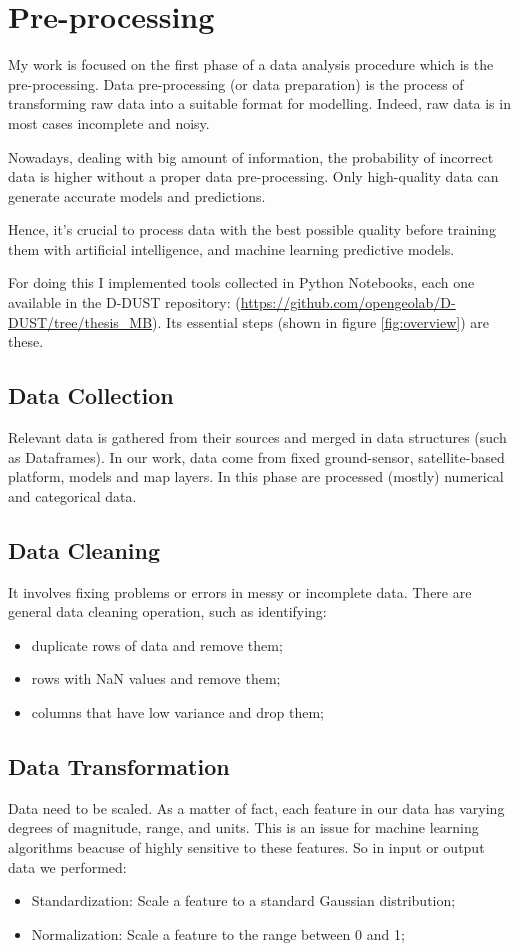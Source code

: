 \section{Pre-processing}
My work is focused on the first phase of a data analysis procedure which is the pre-processing.
Data pre-processing (or data preparation) is the process of transforming raw data into a suitable format for modelling. 
Indeed, raw data is in most cases incomplete and noisy.\par
Nowadays, dealing with big amount of information, the probability of incorrect data is higher without a proper data pre-processing.
Only high-quality data can generate accurate models and predictions. \par
Hence, it’s crucial to process data with the best possible quality before training them with artificial intelligence, and machine learning predictive models.\par
For doing this I implemented tools collected in Python Notebooks, each one available in the D-DUST repository:
(\url{https://github.com/opengeolab/D-DUST/tree/thesis_MB}).\newline
Its essential steps (shown in figure \ref{fig:overview}) are these.

\subsection{Data Collection}
Relevant data is gathered from their sources and merged in data structures (such as Dataframes). In our work, data come from fixed ground-sensor, satellite-based platform, models and map layers. In this phase are processed (mostly) numerical and categorical data. 
\subsection{Data Cleaning}
It involves fixing problems or errors in messy or incomplete data. There are general data cleaning operation, such as identifying:
\begin{itemize}
\item duplicate rows of data and remove them;
\item rows with NaN values and remove them;
\item columns that have low variance and drop them;
\end{itemize}
\subsection{Data Transformation}
Data need to be scaled. As a matter of fact, each feature in our data has varying degrees of magnitude, range, and units. This is an issue for machine learning algorithms beacuse of highly sensitive to these features. So in input or output data we performed:
\begin{itemize}
\item Standardization: Scale a feature to a standard Gaussian distribution;
\item Normalization: Scale a feature to the range between 0 and 1;
\end{itemize}
